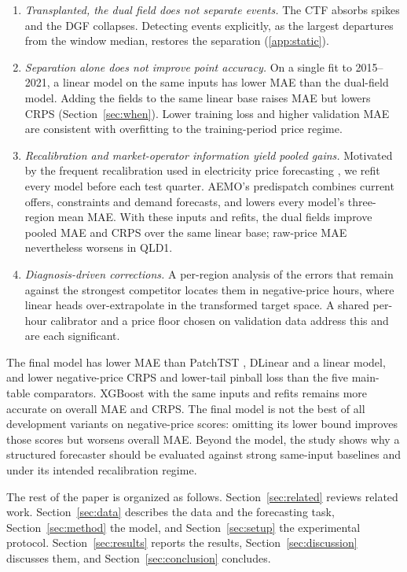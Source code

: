 \documentclass[preprint,12pt]{elsarticle}
\begin{document}
\begin{enumerate}
\item \emph{Transplanted, the dual field does not separate events.} The CTF absorbs spikes and the DGF collapses. Detecting events explicitly, as the largest departures from the window median, restores the separation (\ref{app:static}).
\item \emph{Separation alone does not improve point accuracy.} On a single fit to 2015--2021, a linear model on the same inputs has lower MAE than the dual-field model. Adding the fields to the same linear base raises MAE but lowers CRPS (Section~\ref{sec:when}). Lower training loss and higher validation MAE are consistent with overfitting to the training-period price regime.
\item \emph{Recalibration and market-operator information yield pooled gains.} Motivated by the frequent recalibration used in electricity price forecasting \citep{lago2021forecasting}, we refit every model before each test quarter. AEMO's predispatch combines current offers, constraints and demand forecasts, and lowers every model's three-region mean MAE. With these inputs and refits, the dual fields improve pooled MAE and CRPS over the same linear base; raw-price MAE nevertheless worsens in QLD1.
\item \emph{Diagnosis-driven corrections.} A per-region analysis of the errors that remain against the strongest competitor locates them in negative-price hours, where linear heads over-extrapolate in the transformed target space. A shared per-hour calibrator and a price floor chosen on validation data address this and are each significant.
\end{enumerate}

The final model has lower MAE than PatchTST \citep{nie2023time}, DLinear \citep{zeng2023transformers} and a linear model, and lower negative-price CRPS and lower-tail pinball loss than the five main-table comparators. XGBoost \citep{chen2016xgboost} with the same inputs and refits remains more accurate on overall MAE and CRPS. The final model is not the best of all development variants on negative-price scores: omitting its lower bound improves those scores but worsens overall MAE. Beyond the model, the study shows why a structured forecaster should be evaluated against strong same-input baselines and under its intended recalibration regime.

The rest of the paper is organized as follows. Section~\ref{sec:related} reviews related work. Section~\ref{sec:data} describes the data and the forecasting task, Section~\ref{sec:method} the model, and Section~\ref{sec:setup} the experimental protocol. Section~\ref{sec:results} reports the results, Section~\ref{sec:discussion} discusses them, and Section~\ref{sec:conclusion} concludes.
\end{document}
